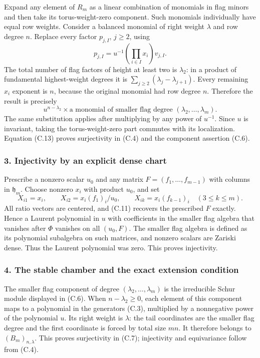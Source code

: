 \documentclass[
  10pt,
]{article}
\begin{document}
Expand any element of \(R_m\) as a linear combination of monomials in
flag minors and then take its torus-weight-zero component. Such
monomials individually have equal row weights. Consider a balanced
monomial of right weight \(\lambda\) and row degree \(n\). Replace every
factor \(p_{j,I}\), \(j\ge2\), using \[
p_{j,I}=u^{-1}\left(\prod_{i\in I}x_i\right)v_{j,I}.
\tag{C.12}
\] The total number of flag factors of height at least two is
\(\lambda_2\): in a product of fundamental highest-weight degrees it is
\(\sum_{j\ge2}(\lambda_j-\lambda_{j+1})\). Every remaining \(x_i\)
exponent is \(n\), because the original monomial had row degree \(n\).
Therefore the result is precisely \[
u^{n-\lambda_2}\times\text{a monomial of smaller flag degree }
(\lambda_2,\ldots,\lambda_m).
\tag{C.13}
\] The same substitution applies after multiplying by any power of
\(u^{-1}\). Since \(u\) is invariant, taking the torus-weight-zero part
commutes with its localization. Equation (C.13) proves surjectivity in
(C.4) and the component assertion (C.6).

\subsubsection{3. Injectivity by an explicit dense
chart}\label{injectivity-by-an-explicit-dense-chart}

Prescribe a nonzero scalar \(u_0\) and any matrix
\(F=(f_1,\ldots,f_{m-1})\) with columns in \(\mathfrak h_m\). Choose
nonzero \(x_i\) with product \(u_0\), and set \[
X_{i1}=x_i,\qquad
X_{i2}=x_i(f_1)_i/u_0,\qquad
X_{ik}=x_i(f_{k-1})_i\quad(3\le k\le m).
\tag{C.14}
\] All ratio vectors are centered, and (C.11) recovers the prescribed
\(F\) exactly. Hence a Laurent polynomial in \(u\) with coefficients in
the smaller flag algebra that vanishes after \(\Phi\) vanishes on all
\((u_0,F)\). The smaller flag algebra is defined as its polynomial
subalgebra on such matrices, and nonzero scalars are Zariski dense. Thus
the Laurent polynomial was zero. This proves injectivity.

\subsubsection{4. The stable chamber and the exact extension
condition}\label{the-stable-chamber-and-the-exact-extension-condition}

The smaller flag component of degree \((\lambda_2,\ldots,\lambda_m)\) is
the irreducible Schur module displayed in (C.6). When
\(n-\lambda_2\ge0\), each element of this component maps to a polynomial
in the generators (C.3), multiplied by a nonnegative power of the
polynomial \(u\). Its right weight is \(\lambda\): the tail coordinates
are the smaller flag degree and the first coordinate is forced by total
size \(mn\). It therefore belongs to \((B_m)_{n,\lambda}\). This proves
surjectivity in (C.7); injectivity and equivariance follow from (C.4).
\end{document}
